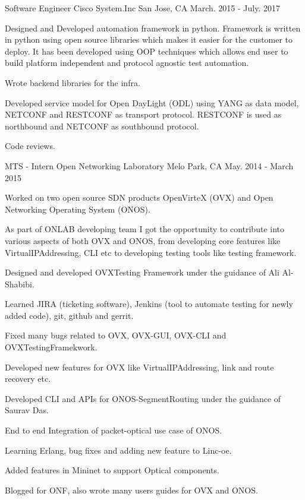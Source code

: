 \begin{cventries}
  \cventry
    {Software Engineer} %
    {Cisco System.Inc} %
    {San Jose, CA} %
    {March. 2015 - July. 2017} %
    {
      \begin{cvitems} %
        \item {Designed and Developed automation framework in python.
                Framework is written in python using open source libraries which makes it easier for the customer to deploy.
                It has been developed using OOP techniques which allows end user to build platform independent and protocol agnostic test automation.}
        \item {Wrote backend libraries for the infra.}
        \item {Developed service model for Open DayLight (ODL) using YANG as data model, NETCONF and RESTCONF as transport protocol.
        		RESTCONF is used as northbound and NETCONF as southbound protocol.}
        \item {Code reviews.}
      \end{cvitems}
    }

  \cventry
    {MTS - Intern} %
    {Open Networking Laboratory} %
    {Melo Park, CA} %
    {May. 2014 - March 2015} %
    {
      \begin{cvitems} %
        \item {Worked on two open source SDN products OpenVirteX (OVX) and Open Networking Operating System (ONOS).}
        \item {As part of ONLAB developing team I got the opportunity to contribute into various aspects of both OVX and 
                ONOS, from developing core features like VirtualIPAddressing, CLI etc to developing testing tools
                like testing framework.}
        \item {Designed and developed OVXTesting Framework under the guidance of Ali Al-Shabibi.}
        \item {Learned JIRA (ticketing software), Jenkins (tool to automate testing for newly added code), git, github and gerrit.}
        \item {Fixed many bugs related to OVX, OVX-GUI, OVX-CLI and OVXTestingFramekwork.}
        \item {Developed new features for OVX like VirtualIPAddressing, link and route recovery etc.}
        \item {Developed CLI and APIs for ONOS-SegmentRouting under the guidance of Saurav Das.}
        \item {End to end Integration of packet-optical use case of ONOS.}
        \item {Learning Erlang, bug fixes and adding new feature to Linc-oe.}
        \item {Added features in Mininet to support Optical components.}
        \item {Blogged for ONF, also wrote many users guides for OVX and ONOS.}
      \end{cvitems}
    }

\end{cventries}

